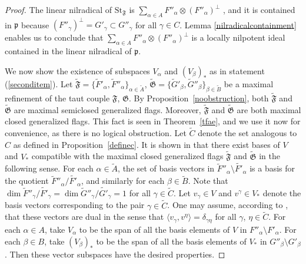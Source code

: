 \documentclass{article}
\newcommand {\St} {\mathrm{St}}
\def\p{\mathfrak {p}}
\def\F{\mathfrak{F}}
\def\G{\mathfrak{G}}
\begin{document}
\begin{proof}
The linear nilradical of $\St_\F$ is $\sum_{\alpha \in A} F''_\alpha \otimes (F''_\alpha)^\perp$ \cite{DP2}, and it is contained in $\p$ because $(F''_\gamma)^\perp = G'_\gamma \subset G''_\gamma$ for all $\gamma \in C$.  Lemma \ref{nilradicalcontainment} enables us to conclude that  $\sum_{\alpha \in A} F''_\alpha \otimes (F''_\alpha)^\perp$ is a locally nilpotent ideal contained in the linear nilradical of $\p$.  
 
We now show the existence of subspaces $V_\alpha$ and $(V_\beta)_*$ as in statement (\ref{seconditem}).  Let $\tilde{\F} = \{ \tilde{F}'_\alpha , \tilde{F}''_\alpha\}_{\alpha \in \tilde{A}}$, $\tilde{\G} = \{ \tilde{G}'_\beta , \tilde{G}''_\beta\}_{\beta \in \tilde{B}}$ be a maximal refinement of the taut couple $\F$, $\G$.  By Proposition~\ref{noobstruction}, both $\tilde{\F}$ and $\tilde{\G}$ are maximal semiclosed generalized flags.  Moreover, $\tilde{\F}$ and $\tilde{\G}$ are both maximal closed generalized flags.  This fact is seen in Theorem~\ref{tfae}, and we use it now for convenience, as there is no logical obstruction.
  Let $\tilde{C}$ denote the set analogous to $C$ as defined in Proposition~\ref{definec}.  It is shown in \cite{DP2} that there exist bases of $V$ and $V_*$ compatible with the maximal closed generalized flags $\tilde{\F}$ and $\tilde{\G}$ in the following sense.  For each $\alpha \in \tilde{A}$, the set of basis vectors in $\tilde{F}''_\alpha \setminus \tilde{F'}_\alpha$ is a basis for the quotient ${\tilde{F}''_\alpha} / {\tilde{F'}_\alpha}$, and similarly for each $\beta \in \tilde{B}$.  Note that $\dim {\tilde{F}''_\gamma} / {\tilde{F'}_\gamma} = \dim  {\tilde{G}''_\gamma} / {\tilde{G'}_\gamma} = 1$ for all $\gamma \in \tilde{C}$.  Let $v_\gamma \in V$ and $v^\gamma \in V_*$ denote the basis vectors corresponding to the pair $\gamma \in \tilde{C}$.  One may assume, according to \cite{DP2}, that these vectors are dual in the sense that $\langle v_\gamma , v^\eta \rangle = \delta_{\gamma \eta}$ for all $\gamma$, $\eta \in \tilde{C}$.  For each $\alpha \in A$, take $V_\alpha$ to be the span of all the basis elements of $V$ in $F''_\alpha \setminus F'_\alpha$.  For each $\beta \in B$, take $(V_\beta)_*$ to be the span of all the basis elements of $V_*$ in $G''_\beta \setminus G'_\beta$.  Then these vector subspaces have the desired properties.


\end{proof}
\end{document}
